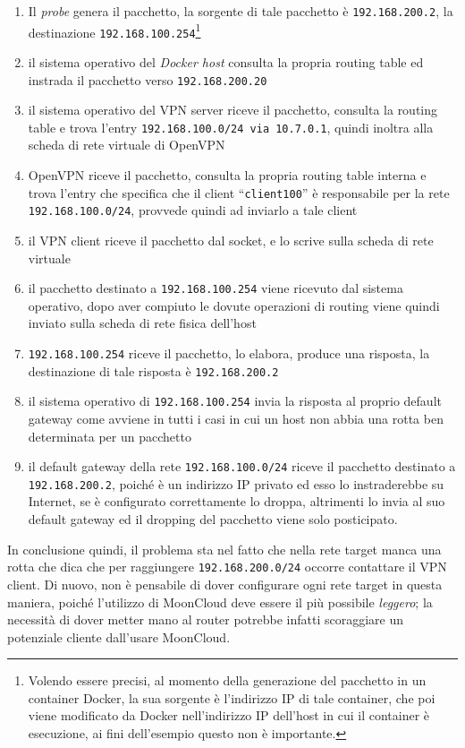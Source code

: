 \begin{enumerate}
  \item Il \textit{probe} genera il pacchetto, la sorgente di tale pacchetto è
  \texttt{192.168.200.2}, la destinazione \texttt{192.168.100.254}\footnote{Volendo essere
  precisi, al momento della generazione
  del pacchetto in un container Docker, la sua sorgente è l'indirizzo IP di tale
  container, che poi viene modificato da Docker nell'indirizzo IP dell'host in cui
  il container è esecuzione, ai fini dell'esempio questo non è importante.}
  \item il sistema operativo del \textit{Docker host} consulta la propria routing table
  ed instrada il pacchetto verso \texttt{192.168.200.20}
  \item il sistema operativo del VPN server riceve il pacchetto, consulta la
  routing table e trova l'entry \texttt{192.168.100.0/24 via 10.7.0.1}, quindi inoltra
  alla scheda di rete virtuale di OpenVPN
  \item OpenVPN riceve il pacchetto, consulta la propria routing table interna e
  trova l'entry che specifica che il client ``\texttt{client100}'' è responsabile per
  la rete \texttt{192.168.100.0/24}, provvede quindi ad inviarlo a tale client
  \item il VPN client riceve il pacchetto dal socket, e lo scrive sulla scheda di rete
  virtuale
  \item il pacchetto destinato a \texttt{192.168.100.254} viene ricevuto dal sistema
  operativo, dopo aver compiuto le dovute operazioni di routing viene quindi inviato
  sulla scheda di rete fisica dell'host
  \item \texttt{192.168.100.254} riceve il pacchetto, lo elabora, produce una risposta,
  la destinazione di tale risposta è \texttt{192.168.200.2}
  \item il sistema operativo di \texttt{192.168.100.254} invia la risposta al proprio
  default gateway come avviene in tutti i casi in cui un host non abbia una rotta
  ben determinata per un pacchetto
  \item il default gateway della rete \texttt{192.168.100.0/24} riceve il pacchetto
  destinato a \texttt{192.168.200.2}, poiché è un indirizzo IP privato ed esso
  lo instraderebbe su Internet, se è configurato correttamente lo droppa, altrimenti
  lo invia al suo default gateway ed il dropping del pacchetto viene solo posticipato.
\end{enumerate}
In conclusione quindi, il problema sta nel fatto che nella rete target manca una rotta
che dica che per raggiungere \texttt{192.168.200.0/24} occorre contattare il
VPN client. Di nuovo, non è pensabile di dover configurare ogni rete target in questa
maniera, poiché l'utilizzo di MoonCloud deve essere il più possibile \textit{leggero};
la necessità di dover metter mano al router potrebbe infatti scoraggiare un potenziale
cliente dall'usare MoonCloud.

